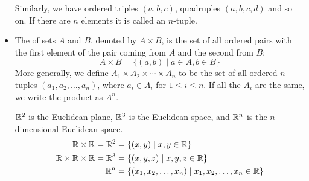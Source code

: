\begin{itemize}
Similarly, we have ordered triples $(a,b,c)$, quadruples $(a,b,c,d)$ and so on. If there are $n$ elements it is called an $n$-tuple.

\item The  of sets $A$ and $B$, denoted by $A \times B$, is the set of all ordered pairs with the first element of the pair coming from $A$ and the
second from $B$:
\begin{equation}
A \times B = \{(a,b) \mid a \in A, b \in B\}
\end{equation}
More generally, we define $A_1 \times A_2 \times \cdots \times A_n$ to be the set of all ordered $n$-tuples $(a_1, a_2, \dots, a_n)$, where $a_i \in A_i$ for $1 \le i \le n$. If all the $A_i$ are the same, we write the product as $A^n$.

\begin{example}
$\mathbb R^2$ is the Euclidean plane, $\mathbb R^3$ is the Euclidean space, and $\mathbb R^n$ is the $n$-dimensional Euclidean space.
\begin{align*}
\mathbb R \times \mathbb R = \mathbb R^2 &= \{(x,y) \mid x,y \in \mathbb R\} \\
\mathbb R \times \mathbb R \times \mathbb R = \mathbb R^3 &= \{(x,y,z) \mid x,y,z \in \mathbb R\} \\
\mathbb R^n &= \{(x_1,x_2,\dots,x_n) \mid x_1,x_2,\dots,x_n \in \mathbb R\}
\end{align*}
\end{example}
\end{itemize}

